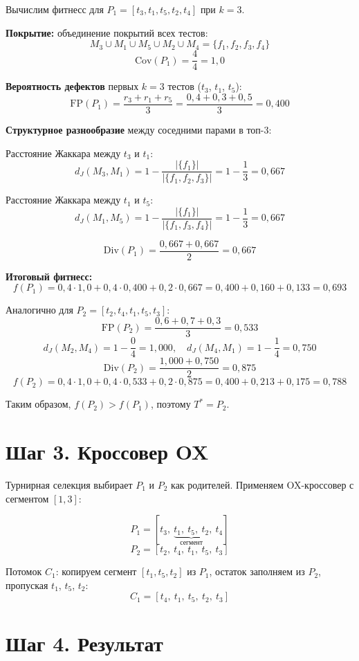 Вычислим фитнесс для $P_1 = [t_3, t_1, t_5, t_2, t_4]$ при $k = 3$.

\textbf{Покрытие:} объединение покрытий всех тестов:
$$M_3 \cup M_1 \cup M_5 \cup M_2 \cup M_4 = \{f_1, f_2, f_3, f_4\}$$
$$\text{Cov}(P_1) = \frac{4}{4} = 1{,}0$$

\textbf{Вероятность дефектов} первых $k=3$ тестов 
($t_3$, $t_1$, $t_5$):
$$\text{FP}(P_1) = \frac{r_3 + r_1 + r_5}{3} = 
\frac{0{,}4 + 0{,}3 + 0{,}5}{3} = 0{,}400$$

\textbf{Структурное разнообразие} между соседними парами в топ-3:

Расстояние Жаккара между $t_3$ и $t_1$:
$$d_J(M_3, M_1) = 1 - \frac{|\{f_1\}|}{|\{f_1, f_2, f_3\}|} = 
1 - \frac{1}{3} = 0{,}667$$

Расстояние Жаккара между $t_1$ и $t_5$:
$$d_J(M_1, M_5) = 1 - \frac{|\{f_1\}|}{|\{f_1, f_3, f_4\}|} = 
1 - \frac{1}{3} = 0{,}667$$

$$\text{Div}(P_1) = \frac{0{,}667 + 0{,}667}{2} = 0{,}667$$

\textbf{Итоговый фитнесс:}
$$f(P_1) = 0{,}4 \cdot 1{,}0 + 0{,}4 \cdot 0{,}400 + 
0{,}2 \cdot 0{,}667 = 0{,}400 + 0{,}160 + 0{,}133 = 0{,}693$$

Аналогично для $P_2 = [t_2, t_4, t_1, t_5, t_3]$:
$$\text{FP}(P_2) = \frac{0{,}6 + 0{,}7 + 0{,}3}{3} = 0{,}533$$
$$d_J(M_2, M_4) = 1 - \frac{0}{4} = 1{,}000, \quad 
d_J(M_4, M_1) = 1 - \frac{1}{4} = 0{,}750$$
$$\text{Div}(P_2) = \frac{1{,}000 + 0{,}750}{2} = 0{,}875$$
$$f(P_2) = 0{,}4 \cdot 1{,}0 + 0{,}4 \cdot 0{,}533 + 
0{,}2 \cdot 0{,}875 = 0{,}400 + 0{,}213 + 0{,}175 = 0{,}788$$

Таким образом, $f(P_2) > f(P_1)$, поэтому $T^* = P_2$.

\section{Шаг 3. Кроссовер OX} \label{ch4:sec4}

Турнирная селекция выбирает $P_1$ и $P_2$ как родителей. 
Применяем OX-кроссовер с сегментом $[1, 3]$:

$$P_1 = [t_3,\ \underbrace{t_1,\ t_5,\ t_2}_{\text{сегмент}},\ t_4]$$
$$P_2 = [t_2,\ t_4,\ t_1,\ t_5,\ t_3]$$

Потомок $C_1$: копируем сегмент $[t_1, t_5, t_2]$ из $P_1$, 
остаток заполняем из $P_2$, пропуская $t_1$, $t_5$, $t_2$:
$$C_1 = [t_4,\ t_1,\ t_5,\ t_2,\ t_3]$$

\section{Шаг 4. Результат} \label{ch4:sec5}

